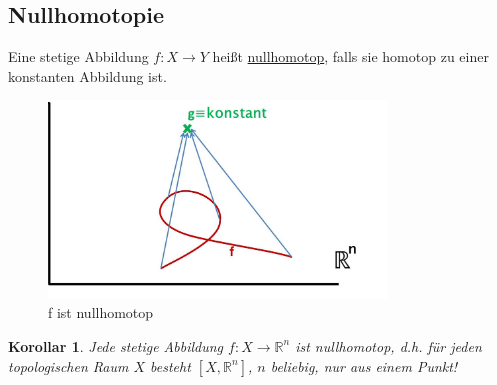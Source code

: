 \documentclass[a4paper,11pt,notitlepage]{report}
\newtheorem{corollary}{Korollar}[chapter]
\newcommand{\R}{{\ensuremath{\mathbb{R}}}}
\newenvironment{Kasten}[1]
{
\hspace{0.05\linewidth}
\begin{center}
\begin{minipage}{0.9\linewidth}
\setlength{\fboxsep}{10pt}
\definecolor{shadecolor}{gray}{1}
\definecolor{framecolor}{gray}{0}
\def\FrameCommand{\fcolorbox{framecolor}{shadecolor}}
\MakeFramed {\FrameRestore}
\subsection{#1}
\begin{itshape}
}
{
\end{itshape}
\endMakeFramed
\end{minipage}
\end{center}
}
\begin{document}
\begin{Kasten}{Nullhomotopie}
Eine stetige Abbildung $f \colon X \rightarrow Y$ heißt \underline{nullhomotop}, falls sie homotop zu einer konstanten Abbildung ist.
\end{Kasten}

\begin{figure}[h]
\centering
\includegraphics[width=0.8\textwidth]{images/Nullhomotopie.jpg}
\caption{f ist nullhomotop}
\end{figure}

\begin{corollary}
Jede stetige Abbildung $f \colon X \rightarrow \R^n$ ist nullhomotop, d.h. für jeden topologischen Raum $X$ besteht $[X, \R^n]$, $n$ beliebig, nur aus einem Punkt!
\end{corollary}
\end{document}
